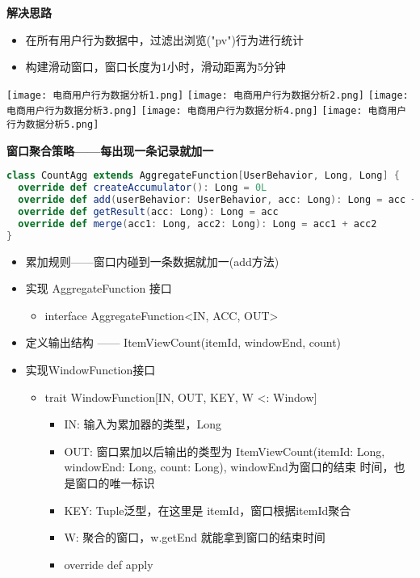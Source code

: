 \documentclass[oneside]{ctexbook}
\begin{document}
\textbf{解决思路}

\begin{itemize}
\item 在所有用户行为数据中，过滤出浏览("pv")行为进行统计
\item 构建滑动窗口，窗口长度为1小时，滑动距离为5分钟
\end{itemize}

\noindent \texttt{[image: 电商用户行为数据分析1.png]}
\noindent \texttt{[image: 电商用户行为数据分析2.png]}
\noindent \texttt{[image: 电商用户行为数据分析3.png]}
\noindent \texttt{[image: 电商用户行为数据分析4.png]}
\noindent \texttt{[image: 电商用户行为数据分析5.png]}

\textbf{窗口聚合策略——每出现一条记录就加一}

\begin{lstlisting}[language=scala]
class CountAgg extends AggregateFunction[UserBehavior, Long, Long] {
  override def createAccumulator(): Long = 0L
  override def add(userBehavior: UserBehavior, acc: Long): Long = acc + 1
  override def getResult(acc: Long): Long = acc
  override def merge(acc1: Long, acc2: Long): Long = acc1 + acc2
}
\end{lstlisting}

\begin{itemize}
\item 累加规则——窗口内碰到一条数据就加一(add方法)
\item 实现 AggregateFunction 接口
\begin{itemize}
\item interface AggregateFunction<IN, ACC, OUT>
\end{itemize}
\item 定义输出结构 —— ItemViewCount(itemId, windowEnd, count)
\item 实现WindowFunction接口
\begin{itemize}
\item trait WindowFunction[IN, OUT, KEY, W <: Window]
\begin{itemize}
\item IN: 输入为累加器的类型，Long
\item OUT: 窗口累加以后输出的类型为 ItemViewCount(itemId: Long, windowEnd: Long, count: Long), windowEnd为窗口的结束 时间，也是窗口的唯一标识
\item KEY: Tuple泛型，在这里是 itemId，窗口根据itemId聚合
\item W: 聚合的窗口，w.getEnd 就能拿到窗口的结束时间
\item override def apply
\end{itemize}
\end{itemize}
\end{itemize}
\end{document}
